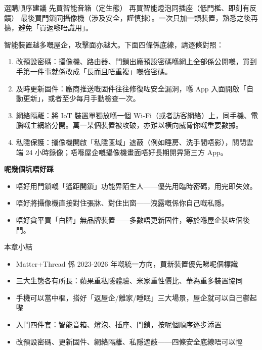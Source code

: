 \begin{tcbinfo}{選購順序建議}
先買智能音箱（定生態） 再買智能燈泡同插座（低門檻、即刻有反饋） 最後買門鎖同攝像機（涉及安全，謹慎揀）。一次只加一類裝置，熟悉之後再擴，避免「買返嚟唔識用」。

\end{tcbinfo}


智能裝置越多嘅屋企，攻擊面亦越大。下面四條係底線，請逐條對照：

\begin{enumerate}
  \item 改預設密碼：攝像機、路由器、門鎖出廠預設密碼喺網上全部係公開嘅，買到手第一件事就係改成「長而且唔重複」嘅強密碼。
  \item 及時更新固件：廠商推送嘅固件往往修復咗安全漏洞，喺 App 入面開啟「自動更新」，或者至少每月手動檢查一次。
  \item 網絡隔離：將 IoT 裝置單獨放喺一個 Wi-Fi（或者訪客網絡）上，同手機、電腦嘅主網絡分開。萬一某個裝置被攻破，亦難以橫向威脅你嘅重要數據。
  \item 私隱保護：攝像機開啟「私隱區域」遮蔽（例如睡房、洗手間唔影），關閉雲端 24 小時錄像；唔喺屋企嘅攝像機畫面唔好長期開畀第三方 App。
\end{enumerate}

\textbf{呢幾個坑唔好踩}\par

\begin{itemize}
  \item 唔好用門鎖嘅「遙距開鎖」功能畀陌生人——優先用臨時密碼，用完即失效。
  \item 唔好將攝像機直接對住張牀、對住出窗——洩露嘅係你自己嘅私隱。
  \item 唔好貪平買「白牌」無品牌裝置——多數唔更新固件，等於喺屋企裝咗個後門。
\end{itemize}

\begin{tcbsummary}{本章小結}
\begin{itemize}
  \item Matter+Thread 係 2023-2026 年嘅統一方向，買新裝置優先睇呢個標識
  \item 三大生態各有所長：蘋果重私隱體驗、米家重性價比、華為重多裝置協同
  \item 手機可以當中樞，搭好「返屋企/離家/睡眠」三大場景，屋企就可以自己鬱起嚟
  \item 入門四件套：智能音箱、燈泡、插座、門鎖，按呢個順序逐步添置
  \item 改預設密碼、更新固件、網絡隔離、私隱遮蔽——四條安全底線唔可以慳
\end{itemize}

\end{tcbsummary}
